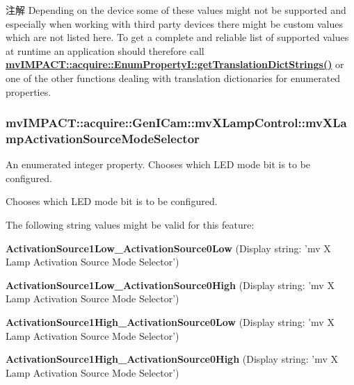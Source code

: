 \begin{DoxyNote}{注解}
Depending on the device some of these values might not be supported and especially when working with third party devices there might be custom values which are not listed here. To get a complete and reliable list of supported values at runtime an application should therefore call {\bfseries \hyperlink{classmv_i_m_p_a_c_t_1_1acquire_1_1_enum_property_i_a0ba6ccbf5ee69784d5d0b537924d26b6}{mv\+I\+M\+P\+A\+C\+T\+::acquire\+::\+Enum\+Property\+I\+::get\+Translation\+Dict\+Strings()}} or one of the other functions dealing with translation dictionaries for enumerated properties. 
\end{DoxyNote}
\hypertarget{classmv_i_m_p_a_c_t_1_1acquire_1_1_gen_i_cam_1_1mv_x_lamp_control_af9b2572ee8f81479c9638110d1b59a8e}{
\subsubsection[{mv\+X\+Lamp\+Activation\+Source\+Mode\+Selector}]{ mv\+I\+M\+P\+A\+C\+T\+::acquire\+::\+Gen\+I\+Cam\+::mv\+X\+Lamp\+Control\+::mv\+X\+Lamp\+Activation\+Source\+Mode\+Selector}}\label{classmv_i_m_p_a_c_t_1_1acquire_1_1_gen_i_cam_1_1mv_x_lamp_control_af9b2572ee8f81479c9638110d1b59a8e}


An enumerated integer property. Chooses which L\+E\+D mode bit is to be configured. 

Chooses which L\+E\+D mode bit is to be configured.

The following string values might be valid for this feature\+:
\begin{DoxyItemize}
\item {\bfseries Activation\+Source1\+Low\+\_\+\+Activation\+Source0\+Low} (Display string\+: 'mv X Lamp Activation Source Mode Selector')
\item {\bfseries Activation\+Source1\+Low\+\_\+\+Activation\+Source0\+High} (Display string\+: 'mv X Lamp Activation Source Mode Selector')
\item {\bfseries Activation\+Source1\+High\+\_\+\+Activation\+Source0\+Low} (Display string\+: 'mv X Lamp Activation Source Mode Selector')
\item {\bfseries Activation\+Source1\+High\+\_\+\+Activation\+Source0\+High} (Display string\+: 'mv X Lamp Activation Source Mode Selector')
\end{DoxyItemize}


